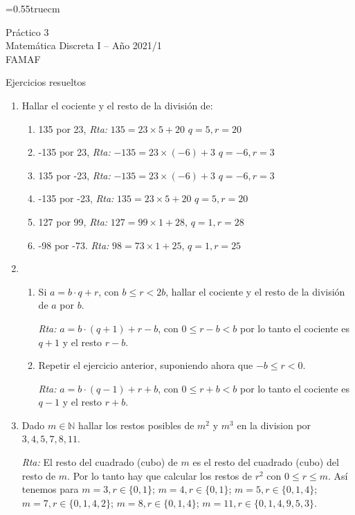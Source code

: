 \documentclass[a4paper,12pt,twoside,spanish,reqno]{amsbook}
\numberwithin{equation}{section}
\newcommand{\rta}{\noindent\textit{Rta: }}
\begin{document}
    \baselineskip=0.55truecm %
    
{\bf \begin{center} Práctico 3 \\ Matemática Discreta I -- Año 2021/1 \\ FAMAF \end{center}}

{\bf \begin{center} Ejercicios resueltos \end{center}}


\begin{enumerate}
\setlength\itemsep{1.1em}

\item Hallar el cociente y el resto de la divisi\'on de:
\begin{enumerate}
\item 
135 por 23, \rta $135= 23\times 5 +20$ $q=5, r=20$
\item
-135 por 23, \rta $-135= 23\times (-6) +3$ $q=-6, r=3$
\item
135 por -23, \rta $ -135= 23\times (-6) +3$ $q=-6, r=3$
\item
-135 por -23, \rta $135= 23\times 5 +20$ $q=5, r=20$
\item
127 por 99, \rta $127=99\times1+28$, $q=1, r=28$
\item
-98 por -73. \rta $ 98=73\times 1+25$, $q=1, r=25$
\end{enumerate}


\item 
\begin{enumerate}
    \item Si $a=b\cdot q+r$, con $b \le r <2 b$, hallar el cociente y el resto de la divisi\'on de $a$ por $b$.
    
    \rta $a = b \cdot (q+1) + r-b$, con $0 \le r-b < b$ por lo tanto el cociente es $q+1$ y el resto  $r-b$.
    
    
    \item Repetir el ejercicio anterior, suponiendo ahora que $-b \le r < 0$.  
    
    \rta  $a = b \cdot (q-1) + r+b$, con $0 \le r+b < b$ por lo tanto el cociente es $q-1$ y el resto  $r+b$.
\end{enumerate}



\item Dado $m\in \mathbb N$ hallar los restos posibles de $m^2$ y $m^3$ en la division por $3,4,5,7,8, 11$.


\rta El resto del cuadrado (cubo)  de $m$ es el resto del cuadrado (cubo)  del resto de $m$.
Por lo tanto hay que calcular los restos de $r^2$ con $0\le r\le m$.
Así tenemos para $m=3, r\in\{0, 1\}$; $m=4, r\in\{0,1\}$; $m=5, r\in\{0,1,4\}$; $m=7,r\in\{0,1,4,2\}$;
$m=8, r\in\{0,1,4\}$; $m=11, r\in\{0,1,4,9,5,3\}$.




\end{enumerate}
\end{document}
